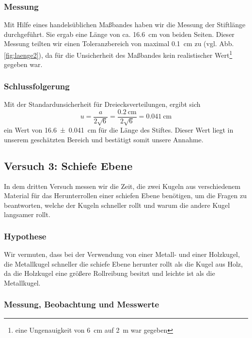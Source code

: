 \documentclass[11pt,a4paper,titlepage, ngerman]{article}
\begin{document}
			\subsubsection{Messung}
				\label{2.2.2}
				
				Mit Hilfe eines handelsüblichen Maßbandes haben wir die Messung der Stiftlänge durchgeführt. 
				Sie ergab eine Länge von ca. \SI{16,6}{\cm} von beiden Seiten. Dieser Messung teilten wir einen Toleranzbereich von maximal \SI{0,1}{\cm} zu (vgl. Abb. \ref{fig:laenge2}), da für die Unsicherheit des Maßbandes kein realistischer Wert\footnote{eine Ungenauigkeit von \SI{6}{\cm} auf \SI{2}{\m} war gegeben} gegeben war.
			
			\subsubsection{Schlussfolgerung}
				
				Mit der Standardunsicherheit für Dreiecksverteilungen, ergibt sich 
				\begin{equation*}
					u = \frac{a}{2 \sqrt{6}} = \frac{\SI{0,2}{\cm}}{2 \sqrt{6}} = \SI{0,041}{\cm}
				\end{equation*}
				ein Wert von \SI{16,6 \pm 0,041}{\cm} für die Länge des Stiftes. Dieser Wert liegt in unserem geschätzten Bereich und bestätigt somit unsere Annahme.
		\subsection{Versuch 3: Schiefe Ebene}
			\label{2.3}	
			
			In dem dritten Versuch messen wir die Zeit, die zwei Kugeln aus verschiedenem Material für das Herunterrollen einer schiefen Ebene benötigen, um die Fragen zu beantworten, welche der Kugeln schneller rollt und warum die andere Kugel langsamer rollt.		
				
			\subsubsection{Hypothese}
				\label{2.3.1}
					
				Wir vermuten, dass bei der Verwendung von einer Metall- und einer Holzkugel, die Metallkugel schneller die schiefe Ebene herunter rollt als die Kugel aus Holz, da die Holzkugel eine größere Rollreibung besitzt und leichte ist als die Metallkugel. 
				
			\subsubsection{Messung, Beobachtung und Messwerte}
				\label{2.3.2}
				
\end{document}
